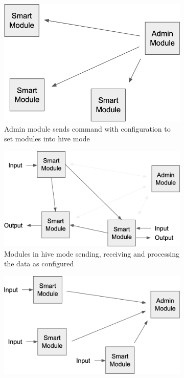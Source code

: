 \begin{figure}[H]
    \centering
    \begin{subfigure}{0.3\textwidth} 
        \includegraphics[width=.8\linewidth]{overleaf/images/hive1.png}
        \caption{Admin module sends command with configuration to set modules into hive mode}
    \end{subfigure}
    \hspace{10pt}
    \begin{subfigure}{0.3\textwidth} 
        \includegraphics[width=\linewidth]{overleaf/images/hive2.png}
        \caption{Modules in hive mode sending, receiving and processing the data as configured}
    \end{subfigure}
    \hspace{10pt}
    \begin{subfigure}{0.32\textwidth}
        \includegraphics[width=\linewidth]{overleaf/images/hive3.png}

\end{subfigure}
\end{figure}

